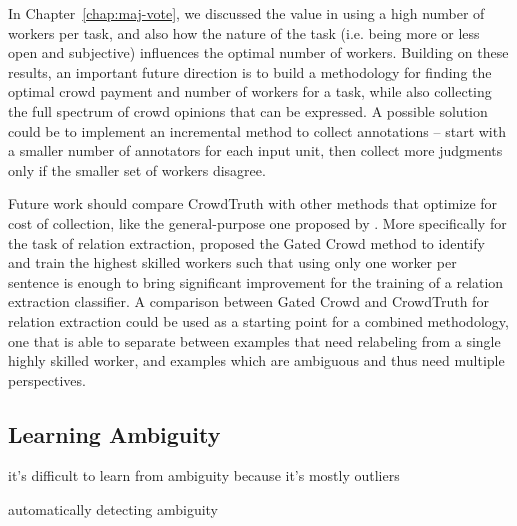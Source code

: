 In Chapter~\ref{chap:maj-vote}, we discussed the value in using a high number of workers per task, and also how the nature of the task (i.e. being more or less open and subjective) influences the optimal number of workers. Building on these results, an important future direction is to build a methodology for finding the optimal crowd payment and number of workers for a task, while also collecting the full spectrum of crowd opinions that can be expressed. A possible solution could be to implement an incremental method to collect annotations -- start with a smaller number of annotators for each input unit, then collect more judgments only if the smaller set of workers disagree.

Future work should compare CrowdTruth with other methods that optimize for cost of collection, like the general-purpose one proposed by \citet{Mizusawa:2018:EPP:3269206.3269292}. More specifically for the task of relation extraction, \citet{liu2016effective} proposed the Gated Crowd method to identify and train the highest skilled workers such that using only one worker per sentence is enough to bring significant improvement for the training of a relation extraction classifier. A comparison between Gated Crowd and CrowdTruth for relation extraction could be used as a starting point for a combined methodology, one that is able to separate between examples that need relabeling from a single highly skilled worker, and examples which are ambiguous and thus need multiple perspectives.


\subsection{Learning Ambiguity}

it's difficult to learn from ambiguity because it's mostly outliers

automatically detecting ambiguity~\cite{lebanoff2018automatic}
